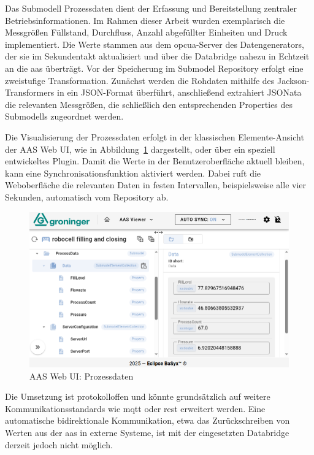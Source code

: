 Das Submodell Prozessdaten dient der Erfassung und Bereitstellung zentraler Betriebsinformationen.
Im Rahmen dieser Arbeit wurden exemplarisch die Messgrößen Füllstand, Durchfluss, Anzahl abgefüllter Einheiten und Druck implementiert.
Die Werte stammen aus dem \acs{opcua}-Server des Datengenerators, der sie im Sekundentakt aktualisiert und über die Databridge nahezu in Echtzeit an die \acs{aas} überträgt.
Vor der Speicherung im Submodel Repository erfolgt eine zweistufige Transformation.
Zunächst werden die Rohdaten mithilfe des Jackson-Transformers in ein JSON-Format überführt, anschließend extrahiert JSONata die relevanten Messgrößen, die schließlich den entsprechenden Properties des Submodells zugeordnet werden.

Die Visualisierung der Prozessdaten erfolgt in der klassischen Elemente-Ansicht der AAS Web UI, wie in Abbildung~\ref{fig:Processdata} dargestellt, oder über ein speziell entwickeltes Plugin.
Damit die Werte in der Benutzeroberfläche aktuell bleiben, kann eine Synchronisationsfunktion aktiviert werden.
Dabei ruft die Weboberfläche die relevanten Daten in festen Intervallen, beispielsweise alle vier Sekunden, automatisch vom Repository ab.

\newpage
\begin{figure}[htbp]
    \centering
    \includegraphics[width=1\textwidth]{Bilder/Ergebnisse/DynamischeDaten/ProcessData/VisualisierungNeu.png}
    \caption{AAS Web UI: Prozessdaten}
    \label{fig:Processdata}
\end{figure}

Die Umsetzung ist protokolloffen und könnte grundsätzlich auf weitere Kommunikationsstandards wie \acs{mqtt} oder \acs{rest} erweitert werden.
Eine automatische bidirektionale Kommunikation, etwa das Zurückschreiben von Werten aus der \acs{aas} in externe Systeme, ist mit der eingesetzten Databridge derzeit jedoch nicht möglich.

